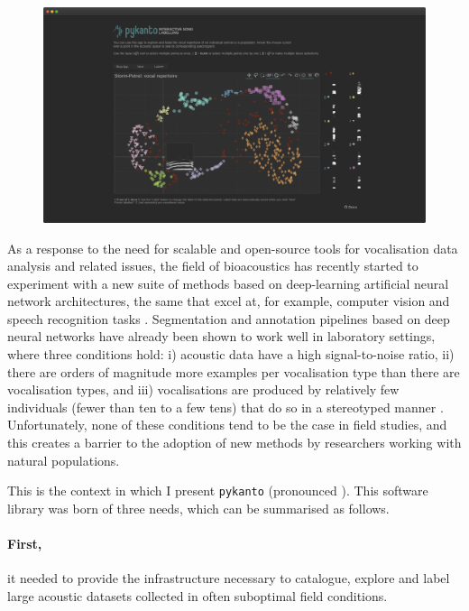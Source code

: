 \begin{figure}[t!]
    \centering
    \includegraphics[width=\linewidth]{figures/chapter_2/fig1.png}
    \label{fig:app}
\end{figure}

As a response to the need for scalable and open-source tools for vocalisation
data analysis and related issues, the field of bioacoustics has recently started
to experiment with a new suite of methods based on deep-learning artificial
neural network architectures, the same that excel at, for example, computer
vision and speech recognition tasks \parencite{stowell2021}. Segmentation and
annotation pipelines based on deep neural networks have already been shown to
work well in laboratory settings, where three conditions hold: i) acoustic data
have a high signal-to-noise ratio, ii) there are orders of magnitude more
examples per vocalisation type than there are vocalisation types, and iii)
vocalisations are produced by relatively few individuals (fewer than ten to a
few tens) that do so in a stereotyped manner \parencite{coffey2019, cohen2022,
steinfath2021}. Unfortunately, none of these conditions tend to be the case in
field studies, and this creates a barrier to the adoption of new methods by
researchers working with natural populations.

This is the context in which I present \texttt{pykanto} (pronounced ). This software library was born of three needs, which can be summarised as follows.

\paragraph{First,} it needed to provide the infrastructure necessary to catalogue,
explore and label large acoustic datasets collected in often suboptimal field
conditions.

